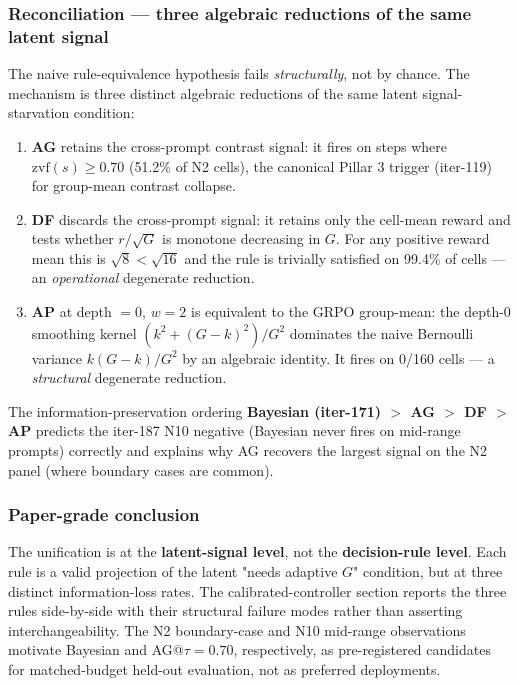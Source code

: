 \subsubsection*{Reconciliation --- three algebraic reductions of the same latent signal}

The naive rule-equivalence hypothesis fails \emph{structurally}, not by
chance.  The mechanism is three distinct algebraic reductions of the
same latent signal-starvation condition:

\begin{enumerate}
\item \textbf{AG} retains the cross-prompt contrast signal: it fires on
      steps where $\mathrm{zvf}(s) \ge 0.70$ (51.2\% of N2 cells), the
      canonical Pillar 3 trigger (iter-119) for group-mean contrast
      collapse.
\item \textbf{DF} discards the cross-prompt signal: it retains only the
      cell-mean reward and tests whether $r / \sqrt{G}$ is monotone
      decreasing in $G$.  For any positive reward mean this is
      $\sqrt{8} < \sqrt{16}$ and the rule is trivially satisfied on
      99.4\% of cells --- an \emph{operational} degenerate reduction.
\item \textbf{AP} at depth $= 0$, $w = 2$ is equivalent to the GRPO
      group-mean: the depth-0 smoothing kernel $(k^2 + (G-k)^2)/G^2$
      dominates the naive Bernoulli variance $k(G-k)/G^2$ by an
      algebraic identity.  It fires on 0/160 cells --- a
      \emph{structural} degenerate reduction.
\end{enumerate}

\noindent The information-preservation ordering
\textbf{Bayesian (iter-171) $>$ AG $>$ DF $>$ AP} predicts the
iter-187 N10 negative (Bayesian never fires on mid-range prompts)
correctly and explains why AG recovers the largest signal on the
N2 panel (where boundary cases are common).

\subsubsection*{Paper-grade conclusion}

The unification is at the \textbf{latent-signal level}, not the
\textbf{decision-rule level}.  Each rule is a valid projection of the
latent "needs adaptive $G$" condition, but at three distinct
information-loss rates.  The calibrated-controller section reports the three
rules side-by-side with their structural failure modes rather than asserting
interchangeability.  The N2 boundary-case and N10 mid-range observations
motivate Bayesian and AG@$\tau=0.70$, respectively, as pre-registered
candidates for matched-budget held-out evaluation, not as preferred
deployments.
